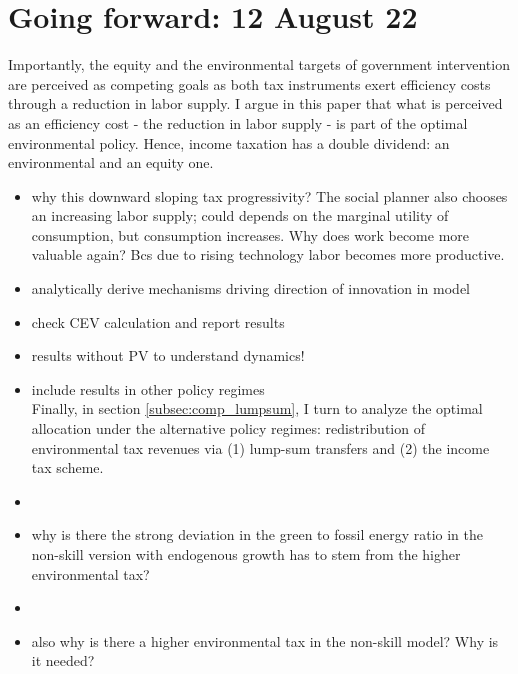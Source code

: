 
\section{Going forward: 12 August 22}

Importantly, the equity and the environmental targets of government intervention are perceived as competing goals as both tax instruments exert efficiency costs through a reduction in labor supply.
I argue in this paper that what is perceived as an efficiency cost -  the reduction in labor supply - is part of the optimal environmental policy. Hence, income taxation has a double dividend: an environmental and an equity one.   




\begin{itemize}
	\item why this downward sloping tax progressivity? The social planner also chooses an increasing labor supply; could depends on the marginal utility of consumption, but consumption increases. Why does work become more valuable again? 
	Bcs due to rising technology labor becomes more productive. 
	\item analytically derive mechanisms driving direction of innovation in model
	\item check CEV calculation and report results
	\item results without PV to understand dynamics!
	\item include results in other policy regimes\\
	Finally, in section \ref{subsec:comp_lumpsum}, I turn to analyze the optimal allocation under the alternative policy regimes: redistribution of environmental tax revenues via (1) lump-sum transfers and (2) the income tax scheme. 
	\item {}
	\item why is there the strong deviation in the green to fossil energy ratio in the non-skill version with endogenous growth \ar has to stem from the higher environmental tax? \checkmark 
	\item {}
	\item also why is there a higher environmental tax in the non-skill model? Why is it needed? \checkmark
\end{itemize}
